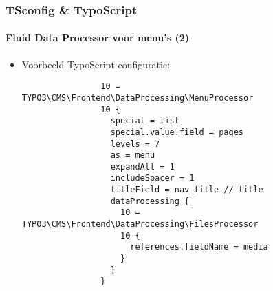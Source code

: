 \begin{frame}[fragile]
	\frametitle{TSconfig \& TypoScript}
	\framesubtitle{Fluid Data Processor voor menu's (2)}

	\lstset{basicstyle=\tiny\ttfamily}

	\begin{itemize}
		\item Voorbeeld TypoScript-configuratie:

			\begin{lstlisting}
				10 = TYPO3\CMS\Frontend\DataProcessing\MenuProcessor
				10 {
				  special = list
				  special.value.field = pages
				  levels = 7
				  as = menu
				  expandAll = 1
				  includeSpacer = 1
				  titleField = nav_title // title
				  dataProcessing {
				    10 = TYPO3\CMS\Frontend\DataProcessing\FilesProcessor
				    10 {
				      references.fieldName = media
				    }
				  }
				}
			\end{lstlisting}

	\end{itemize}

\end{frame}


